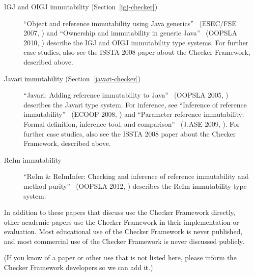 \begin{description}
\item[IGJ and OIGJ immutability (Section~\ref{igj-checker})]
``Object and reference immutability using Java generics''~\cite{ZibinPAAKE2007} (ESEC/FSE 2007, )
and
``Ownership and immutability in generic Java''~\cite{ZibinPLAE2010} (OOPSLA 2010, )
            describe the IGJ and OIGJ immutability type systems.
For further case studies, also see the ISSTA 2008 paper about the Checker
Framework, described above.

\item[Javari immutability (Section~\ref{javari-checker})]
``Javari: Adding reference immutability to Java''~\cite{TschantzE2005} (OOPSLA 2005, )
            describes the Javari type system.
For inference, see
``Inference of reference immutability''~\cite{QuinonezTE2008} (ECOOP 2008, )
and
``Parameter reference immutability: Formal definition, inference tool, and comparison''~\cite{ArtziQKE2009} (J.ASE 2009, ).
For further case studies, also see the ISSTA 2008 paper about the Checker
Framework, described above.

\item[ReIm immutability]
``ReIm \& ReImInfer: Checking and inference of reference immutability and method purity''~\cite{HuangMDE2012} (OOPSLA 2012, )
            describes the ReIm immutability type system.

\end{description}

In addition to these papers that discuss use the Checker Framework
directly, other academic papers use the Checker Framework in their
implementation or evaluation.
Most educational use of the Checker
Framework is never published, and most commercial use of the Checker
Framework is never discussed publicly.

(If you know of a paper or other use that is not listed here, please inform
the Checker Framework developers so we can add it.)


